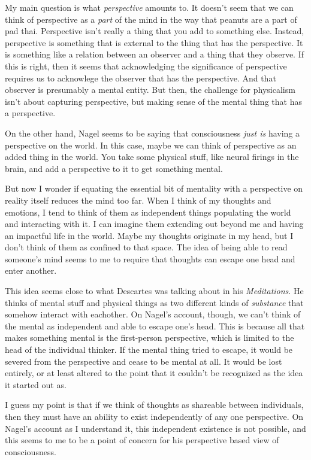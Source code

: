 \documentclass{article}
\begin{document}
My main question is what \emph{perspective} amounts to. It doesn't seem
that we can think of perspective as a \emph{part} of the mind in the way
that peanuts are a part of pad thai. Perspective isn't really a thing
that you add to something else. Instead, perspective is something that
is external to the thing that has the perspective. It is something like
a relation between an observer and a thing that they observe. If this is
right, then it seems that acknowledging the significance of perspective
requires us to acknowlege the observer that has the perspective. And
that observer is presumably a mental entity. But then, the challenge for
physicalism isn't about capturing perspective, but making sense of the
mental thing that has a perspective.

On the other hand, Nagel seems to be saying that consciousness
\emph{just is} having a perspective on the world. In this case, maybe we
can think of perspective as an added thing in the world. You take some
physical stuff, like neural firings in the brain, and add a perspective
to it to get something mental.

But now I wonder if equating the essential bit of mentality with a
perspective on reality itself reduces the mind too far. When I think of
my thoughts and emotions, I tend to think of them as independent things
populating the world and interacting with it. I can imagine them
extending out beyond me and having an impactful life in the world. Maybe
my thoughts originate in my head, but I don't think of them as confined
to that space. The idea of being able to read someone's mind seems to me
to require that thoughts can escape one head and enter another.

This idea seems close to what Descartes was talking about in his
\emph{Meditations}. He thinks of mental stuff and physical things as two
different kinds of \emph{substance} that somehow interact with
eachother. On Nagel's account, though, we can't think of the mental as
independent and able to escape one's head. This is because all that
makes something mental is the first-person perspective, which is limited
to the head of the individual thinker. If the mental thing tried to
escape, it would be severed from the perspective and cease to be mental
at all. It would be lost entirely, or at least altered to the point that
it couldn't be recognized as the idea it started out as.

I guess my point is that if we think of thoughts as shareable between
individuals, then they must have an ability to exist independently of
any one perspective. On Nagel's account as I understand it, this
independent existence is not possible, and this seems to me to be a
point of concern for his perspective based view of consciousness.
\end{document}
